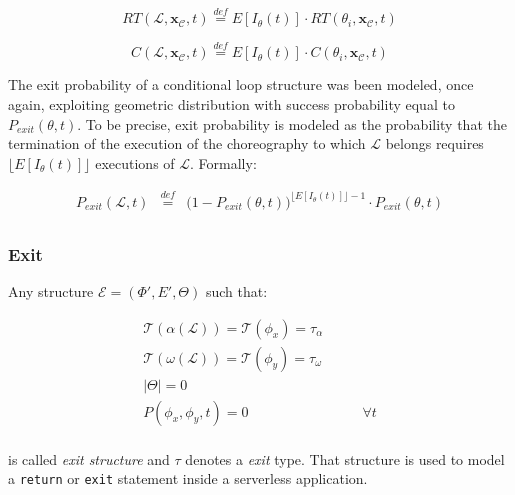 \documentclass[12pt,a4paper]{report}
\newcommand{\mathDef}{\overset{\textit{def}}{=}}
\begin{document}
\begin{equation}
	RT(\mathcal{L},\textbf{x}_{\mathcal{C}}, t) \mathDef E[I_{\theta}(t)] \cdot RT(\theta_i,\textbf{x}_{\mathcal{C}}, t)
\end{equation}

\begin{equation}
	C(\mathcal{L},\textbf{x}_{\mathcal{C}}, t) \mathDef E[I_{\theta}(t)] \cdot C(\theta_i,\textbf{x}_{\mathcal{C}}, t)
\end{equation}

The exit probability of a conditional loop structure was been modeled, once again, exploiting geometric distribution with success probability equal to $P_{exit}(\theta, t)$. To be precise, exit probability is modeled as the probability that the termination of the execution of the choreography to which $\mathcal{L}$ belongs requires $\lfloor E[I_{\theta}(t)] \rfloor$  executions of $\mathcal{L}$. Formally:

\begin{eqnarray}
	P_{exit}(\mathcal{L}, t) & \mathDef & \Big(1 -P_{exit}(\theta, t)  \Big)^{\lfloor E[I_{\theta}(t)] \rfloor - 1} \cdot P_{exit}(\theta, t)\\
\end{eqnarray}

\subsubsection{Exit}

Any structure $\mathcal{E} = (\Phi',E',\Theta)$ such that:

\begin{eqnarray}
	\mathscr{T}(\alpha(\mathcal{L})) = \mathscr{T}(\phi_x) = \tau_{\alpha} \\ \mathscr{T}(\omega(\mathcal{L})) = \mathscr{T}(\phi_y) = \tau_{\omega} \\
	|\Theta| = 0  & \\
	P(\phi_{x}, \phi_{y},t) = 0 & \qquad \forall t \\
\end{eqnarray}

is called \textit{exit structure} and $\tau$ denotes a \textit{exit} type. That structure is used to model a \texttt{return} or \texttt{exit} statement inside a serverless application. 
\end{document}
